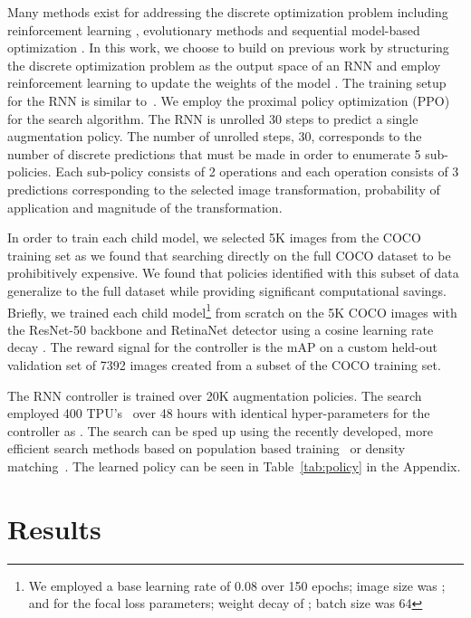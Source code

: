 \documentclass[10pt,twocolumn,letterpaper]{article}
\begin{document}
Many methods exist for addressing the discrete optimization problem including reinforcement learning \cite{zoph2016neural}, evolutionary methods \cite{real2018regularized} and sequential model-based optimization \cite{liu2017progressive}. In this work, we choose to build on previous work by structuring the discrete optimization problem as the output space of an RNN and employ reinforcement learning to update the weights of the model \cite{zoph2016neural}. The training setup for the RNN is similar to~\cite{zoph2016neural,zoph2017learning, cubuk2017intriguing, cubuk2018autoaugment}. We employ the proximal policy optimization (PPO) \cite{schulman2017proximal} for the search algorithm. The RNN is unrolled 30 steps to predict a single augmentation policy. The number of unrolled steps, 30,  corresponds to the number of discrete predictions that must be made in order to enumerate 5 sub-policies. Each sub-policy consists of 2 operations and each operation consists of 3 predictions corresponding to the selected image transformation, probability of application and magnitude of the transformation.



In order to train each child model, we selected 5K images from the COCO training set as we found that searching directly on the full COCO dataset to be prohibitively expensive. We found that policies identified with this subset of data generalize to the full dataset while providing significant computational savings. Briefly, we trained each child model\footnote{We employed a base learning rate of 0.08 over 150 epochs; image size was ;  and  for the focal loss parameters; weight decay of ; batch size was 64} from scratch on the 5K COCO images with the ResNet-50 backbone \cite{he2016deep} and RetinaNet detector \cite{lin2017focal} using a cosine learning rate decay \cite{cosine}.
The reward signal for the controller is the mAP on a custom held-out validation set of 7392 images created from a subset of the COCO training set.

The RNN controller is trained over 20K augmentation policies. The search employed 400 TPU's~\cite{jouppi2017datacenter} over 48 hours with identical hyper-parameters for the controller as \cite{zoph2017learning}. The search can be sped up using the recently developed, more efficient search methods based on population based training~\cite{ho2019population} or density matching~\cite{lim2019fast}. The learned policy can be seen in Table~\ref{tab:policy} in the Appendix. 
\section{Results}
\label{sec:results}
\end{document}

